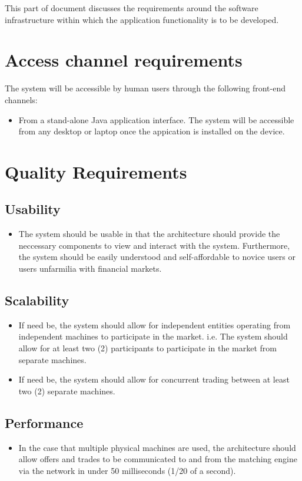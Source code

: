 \documentclass[12pt]{article}
\begin{document}
				  
		\newpage
		This part of document discusses the requirements around the software infrastructure within which the application functionality is to be developed. 
		\section{Access channel requirements}
		The system will be accessible by human users through the following front-end channels:
		\begin{itemize}
		\item From a stand-alone Java application interface. The system will be accessible from any desktop or laptop once the appication is installed on the device.
		\end{itemize}
		
		\section{Quality Requirements}
			\subsection{Usability}
			\begin{itemize}
			\item The system should be usable in that the architecture should provide the neccessary components to view and interact with the system. Furthermore, the system should be easily understood and self-affordable to novice users or users unfarmilia with financial markets.
			\end{itemize}
			\subsection{Scalability}
			\begin{itemize}
			\item If need be, the system should allow for independent entities operating from independent machines to participate in the market. i.e. The system should allow for at least two (2) participants to participate in the market from separate machines.
			\item If need be, the system should allow for concurrent trading between at least two (2) separate machines.
			\end{itemize}
			\subsection{Performance}
			\begin{itemize}
			\item In the case that multiple physical machines are used, the architecture should allow offers and trades to be communicated to and from the matching engine via the network in under 50 milliseconds (1/20 of a second). 
			\end{itemize}
\end{document}
